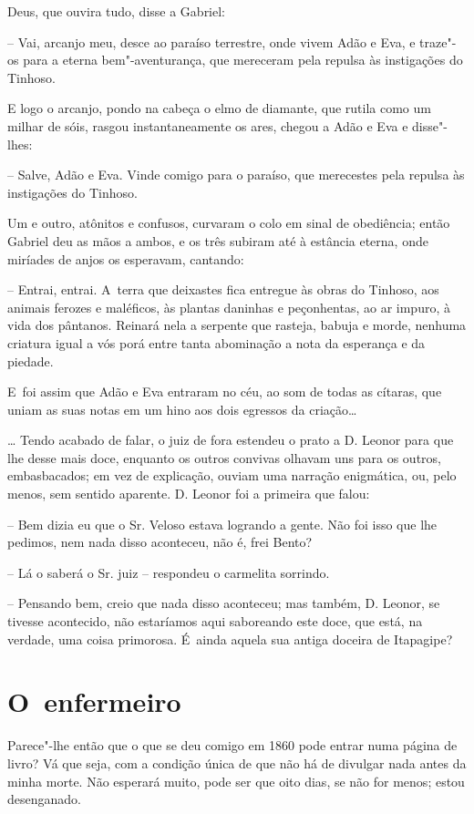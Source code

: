Deus, que ouvira tudo, disse a Gabriel:

-- Vai, arcanjo meu, desce ao paraíso terrestre, onde vivem Adão e Eva,
e traze"-os para a eterna bem"-aventurança, que mereceram pela repulsa às
instigações do Tinhoso.

E logo o arcanjo, pondo na cabeça o elmo de diamante, que rutila como um
milhar de sóis, rasgou instantaneamente os ares, chegou a Adão e Eva e
disse"-lhes:

-- Salve, Adão e Eva. Vinde comigo para o paraíso, que merecestes pela
repulsa às instigações do Tinhoso.

Um e outro, atônitos e confusos, curvaram o colo em sinal de obediência;
então Gabriel deu as mãos a ambos, e os três subiram até à estância
eterna, onde miríades de anjos os esperavam, cantando:

-- Entrai, entrai. A~terra que deixastes fica entregue às obras do
Tinhoso, aos animais ferozes e maléficos, às plantas daninhas e
peçonhentas, ao ar impuro, à vida dos pântanos. Reinará nela a serpente
que rasteja, babuja e morde, nenhuma criatura igual a vós porá entre
tanta abominação a nota da esperança e da piedade.

E~foi assim que Adão e Eva entraram no céu, ao som de todas as cítaras,
que uniam as suas notas em um hino aos dois egressos da criação\ldots{}

\ldots{} Tendo acabado de falar, o juiz de fora estendeu o prato a D. Leonor
para que lhe desse mais doce, enquanto os outros convivas olhavam uns
para os outros, embasbacados; em vez de explicação, ouviam uma narração
enigmática, ou, pelo menos, sem sentido aparente. D. Leonor foi a
primeira que falou:

-- Bem dizia eu que o Sr. Veloso estava logrando a gente. Não foi isso
que lhe pedimos, nem nada disso aconteceu, não é, frei Bento?

-- Lá o saberá o Sr. juiz -- respondeu o carmelita sorrindo.

-- Pensando bem, creio que nada disso aconteceu; mas também, D. Leonor,
se tivesse acontecido, não estaríamos aqui saboreando este doce, que
está, na verdade, uma coisa primorosa. É~ainda aquela sua antiga doceira
de Itapagipe?

\chapter{O~enfermeiro}

Parece"-lhe então que o que se deu comigo em 1860 pode entrar numa página
de livro? Vá que seja, com a condição única de que não há de divulgar
nada antes da minha morte. Não esperará muito, pode ser que oito dias,
se não for menos; estou desenganado.

